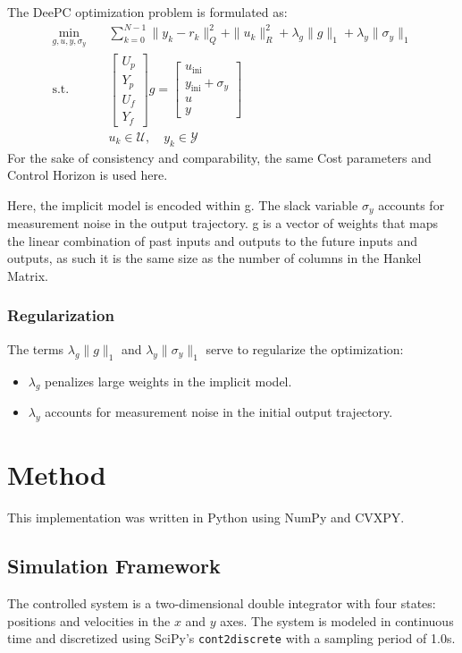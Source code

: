 \documentclass[11pt,a4paper]{article}
\begin{document}
The DeePC optimization problem is formulated as:
\[
\begin{aligned}
\min_{g, u, y, \sigma_y} &\quad \sum_{k=0}^{N-1} \|y_k - r_k\|_Q^2 + \|u_k\|_R^2 + \lambda_g \|g\|_1 + \lambda_y \|\sigma_y\|_1 \\
\text{s.t.} &\quad \begin{bmatrix} U_p \\ Y_p \\ U_f \\ Y_f \end{bmatrix} g = \begin{bmatrix} u_{\text{ini}} \\ y_{\text{ini}} + \sigma_y \\ u \\ y \end{bmatrix} \\
&\quad u_k \in \mathcal{U}, \quad y_k \in \mathcal{Y}
\end{aligned}
\]
For the sake of consistency and comparability, the same Cost parameters and Control Horizon is used here.


Here, the implicit model is encoded within g. The slack variable \(\sigma_y\) accounts for measurement noise in the output trajectory.
g is a vector of weights that maps the linear combination of past inputs and outputs to the future inputs and outputs, as such it is the same size as the number of columns in the Hankel Matrix.


\subsubsection{Regularization}
The terms \( \lambda_g \|g\|_1 \) and \( \lambda_y \|\sigma_y\|_1 \) serve to regularize the optimization:
\begin{itemize}
    \item \( \lambda_g \) penalizes large weights in the implicit model.
    \item \( \lambda_y \) accounts for measurement noise in the initial output trajectory.
\end{itemize}

\section{Method}
This implementation was written in Python using NumPy and CVXPY.

\subsection{Simulation Framework}
The controlled system is a two-dimensional double integrator with four states: positions and velocities in the \(x\) and \(y\) axes. The system is modeled in continuous time and discretized using SciPy’s \texttt{cont2discrete} with a sampling period of 1.0s.
\end{document}

